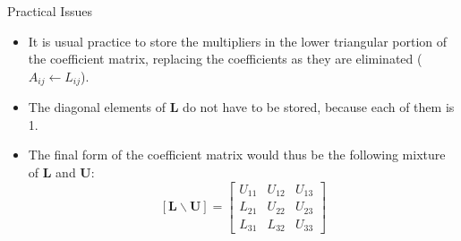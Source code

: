 \documentclass{beamer}
\begin{document}
\begin{frame}{Practical Issues}
\begin{itemize}
\item It is usual practice to store the multipliers in the \alert{lower triangular portion} of the coefficient matrix, replacing the coefficients as they are eliminated ($A_{ij} \leftarrow L_{ij}$). 
\item The diagonal elements of $\mathbf{L}$ do not have to be stored, because each of them is 1.
\item The final form of the coefficient matrix would thus be the following mixture of $\mathbf{L}$ and $\mathbf{U}$:
\[
[\mathbf{L} \backslash \mathbf{U}]=
\left[
\begin{array}{ccc}
U_{11} & U_{12} &U_{13} \\
L_{21} & U_{22} &  U_{23}  \\
L_{31} & L_{32} &  U_{33}
\end{array}\right]
\]
\end{itemize}
\end{frame}
\end{document}
